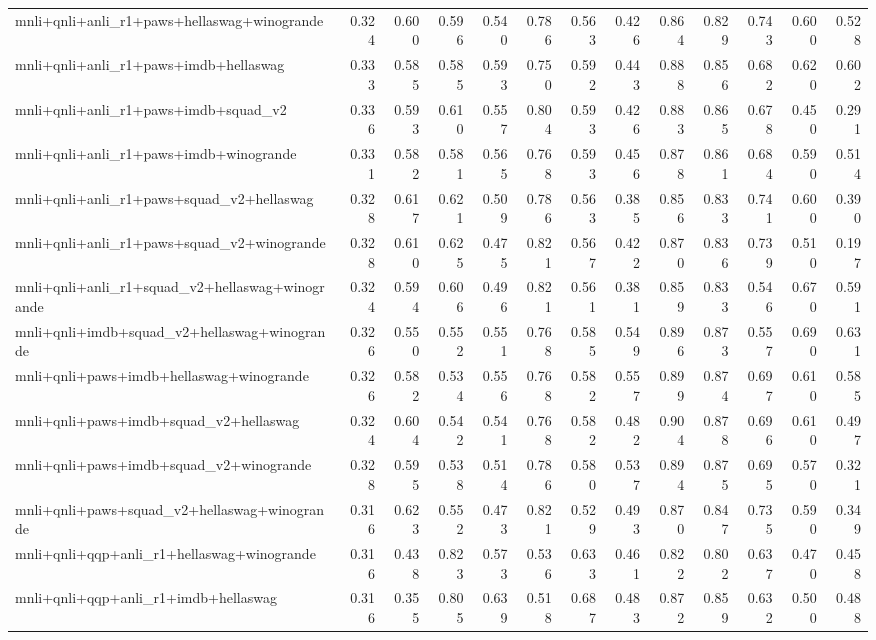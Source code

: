 \begin{table}[t]
\begin{tabular}{lrrrrrrrrrrrr}
    mnli+qnli+anli\_r1+paws+hellaswag+winogrande & 0.324 & 0.600 & 0.596 & 0.540 & 0.786 & 0.563 & 0.426 & 0.864 & 0.829 & 0.743 & 0.600 & 0.528 \\
    mnli+qnli+anli\_r1+paws+imdb+hellaswag & 0.333 & 0.585 & 0.585 & 0.593 & 0.750 & 0.592 & 0.443 & 0.888 & 0.856 & 0.682 & 0.620 & 0.602 \\
    mnli+qnli+anli\_r1+paws+imdb+squad\_v2 & 0.336 & 0.593 & 0.610 & 0.557 & 0.804 & 0.593 & 0.426 & 0.883 & 0.865 & 0.678 & 0.450 & 0.291 \\
    mnli+qnli+anli\_r1+paws+imdb+winogrande & 0.331 & 0.582 & 0.581 & 0.565 & 0.768 & 0.593 & 0.456 & 0.878 & 0.861 & 0.684 & 0.590 & 0.514 \\
    mnli+qnli+anli\_r1+paws+squad\_v2+hellaswag & 0.328 & 0.617 & 0.621 & 0.509 & 0.786 & 0.563 & 0.385 & 0.856 & 0.833 & 0.741 & 0.600 & 0.390 \\
    mnli+qnli+anli\_r1+paws+squad\_v2+winogrande & 0.328 & 0.610 & 0.625 & 0.475 & 0.821 & 0.567 & 0.422 & 0.870 & 0.836 & 0.739 & 0.510 & 0.197 \\
    mnli+qnli+anli\_r1+squad\_v2+hellaswag+winogrande & 0.324 & 0.594 & 0.606 & 0.496 & 0.821 & 0.561 & 0.381 & 0.859 & 0.833 & 0.546 & 0.670 & 0.591 \\
    mnli+qnli+imdb+squad\_v2+hellaswag+winogrande & 0.326 & 0.550 & 0.552 & 0.551 & 0.768 & 0.585 & 0.549 & 0.896 & 0.873 & 0.557 & 0.690 & 0.631 \\
    mnli+qnli+paws+imdb+hellaswag+winogrande & 0.326 & 0.582 & 0.534 & 0.556 & 0.768 & 0.582 & 0.557 & 0.899 & 0.874 & 0.697 & 0.610 & 0.585 \\
    mnli+qnli+paws+imdb+squad\_v2+hellaswag & 0.324 & 0.604 & 0.542 & 0.541 & 0.768 & 0.582 & 0.482 & 0.904 & 0.878 & 0.696 & 0.610 & 0.497 \\
    mnli+qnli+paws+imdb+squad\_v2+winogrande & 0.328 & 0.595 & 0.538 & 0.514 & 0.786 & 0.580 & 0.537 & 0.894 & 0.875 & 0.695 & 0.570 & 0.321 \\
    mnli+qnli+paws+squad\_v2+hellaswag+winogrande & 0.316 & 0.623 & 0.552 & 0.473 & 0.821 & 0.529 & 0.493 & 0.870 & 0.847 & 0.735 & 0.590 & 0.349 \\
    mnli+qnli+qqp+anli\_r1+hellaswag+winogrande & 0.316 & 0.438 & 0.823 & 0.573 & 0.536 & 0.633 & 0.461 & 0.822 & 0.802 & 0.637 & 0.470 & 0.458 \\
    mnli+qnli+qqp+anli\_r1+imdb+hellaswag & 0.316 & 0.355 & 0.805 & 0.639 & 0.518 & 0.687 & 0.483 & 0.872 & 0.859 & 0.632 & 0.500 & 0.488 \\

\end{tabular}
\end{table}
